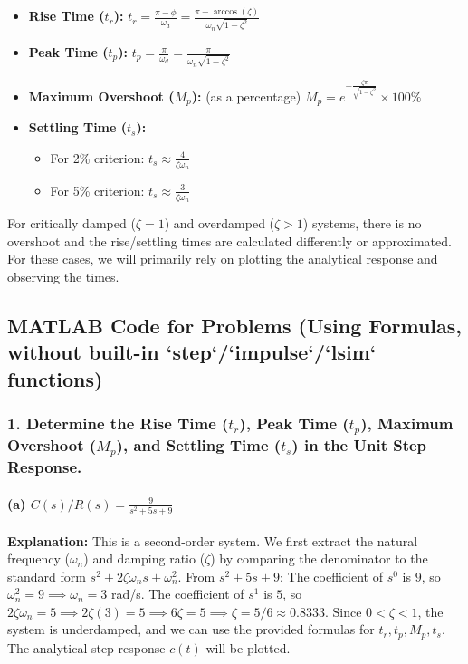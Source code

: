 \documentclass[a4paper,12pt]{article}
\begin{document}
	\begin{itemize}
		\item \textbf{Rise Time ($t_r$):}
		$t_r = \frac{\pi - \phi}{\omega_d} = \frac{\pi - \arccos(\zeta)}{\omega_n \sqrt{1-\zeta^2}}$
		
		\item \textbf{Peak Time ($t_p$):}
		$t_p = \frac{\pi}{\omega_d} = \frac{\pi}{\omega_n \sqrt{1-\zeta^2}}$
		
		\item \textbf{Maximum Overshoot ($M_p$):} (as a percentage)
		$M_p = e^{-\frac{\zeta\pi}{\sqrt{1-\zeta^2}}} \times 100\%$
		
		\item \textbf{Settling Time ($t_s$):}
		\begin{itemize}
			\item For 2\% criterion: $t_s \approx \frac{4}{\zeta\omega_n}$
			\item For 5\% criterion: $t_s \approx \frac{3}{\zeta\omega_n}$
		\end{itemize}
	\end{itemize}
	For critically damped ($\zeta=1$) and overdamped ($\zeta>1$) systems, there is no overshoot and the rise/settling times are calculated differently or approximated. For these cases, we will primarily rely on plotting the analytical response and observing the times.
	
	\subsection*{MATLAB Code for Problems (Using Formulas, without built-in `step`/`impulse`/`lsim` functions)}
	
	\subsubsection*{1. Determine the Rise Time ($t_r$), Peak Time ($t_p$), Maximum Overshoot ($M_p$), and Settling Time ($t_s$) in the Unit Step Response.}
	
	\paragraph{(a) $C(s)/R(s) = \frac{9}{s^2+5s+9}$}
	\textbf{Explanation:}
	This is a second-order system. We first extract the natural frequency ($\omega_n$) and damping ratio ($\zeta$) by comparing the denominator to the standard form $s^2 + 2\zeta\omega_n s + \omega_n^2$.
	From $s^2+5s+9$:
	The coefficient of $s^0$ is $9$, so $\omega_n^2 = 9 \implies \omega_n = 3$ rad/s.
	The coefficient of $s^1$ is $5$, so $2\zeta\omega_n = 5 \implies 2\zeta(3) = 5 \implies 6\zeta = 5 \implies \zeta = 5/6 \approx 0.8333$.
	Since $0 < \zeta < 1$, the system is underdamped, and we can use the provided formulas for $t_r, t_p, M_p, t_s$.
	The analytical step response $c(t)$ will be plotted.
	
\end{document}
